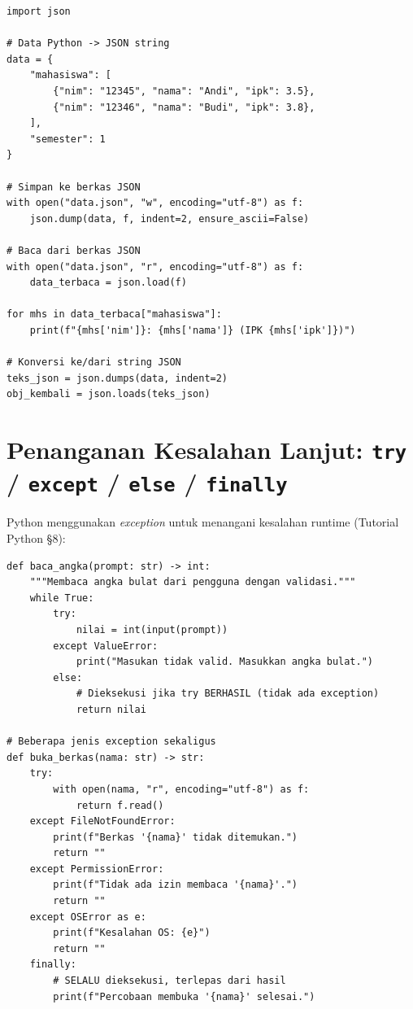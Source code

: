 \documentclass[../main.tex]{subfiles}
\begin{document}
\begin{lstlisting}[caption=Membaca dan menulis JSON]
import json

# Data Python -> JSON string
data = {
    "mahasiswa": [
        {"nim": "12345", "nama": "Andi", "ipk": 3.5},
        {"nim": "12346", "nama": "Budi", "ipk": 3.8},
    ],
    "semester": 1
}

# Simpan ke berkas JSON
with open("data.json", "w", encoding="utf-8") as f:
    json.dump(data, f, indent=2, ensure_ascii=False)

# Baca dari berkas JSON
with open("data.json", "r", encoding="utf-8") as f:
    data_terbaca = json.load(f)

for mhs in data_terbaca["mahasiswa"]:
    print(f"{mhs['nim']}: {mhs['nama']} (IPK {mhs['ipk']})")

# Konversi ke/dari string JSON
teks_json = json.dumps(data, indent=2)
obj_kembali = json.loads(teks_json)
\end{lstlisting}

\section{Penanganan Kesalahan Lanjut: \texttt{try} / \texttt{except} / \texttt{else} / \texttt{finally}}

Python menggunakan \textit{exception} untuk menangani kesalahan runtime (Tutorial Python §8):

\begin{lstlisting}[caption=Pola try/except/else/finally lengkap]
def baca_angka(prompt: str) -> int:
    """Membaca angka bulat dari pengguna dengan validasi."""
    while True:
        try:
            nilai = int(input(prompt))
        except ValueError:
            print("Masukan tidak valid. Masukkan angka bulat.")
        else:
            # Dieksekusi jika try BERHASIL (tidak ada exception)
            return nilai

# Beberapa jenis exception sekaligus
def buka_berkas(nama: str) -> str:
    try:
        with open(nama, "r", encoding="utf-8") as f:
            return f.read()
    except FileNotFoundError:
        print(f"Berkas '{nama}' tidak ditemukan.")
        return ""
    except PermissionError:
        print(f"Tidak ada izin membaca '{nama}'.")
        return ""
    except OSError as e:
        print(f"Kesalahan OS: {e}")
        return ""
    finally:
        # SELALU dieksekusi, terlepas dari hasil
        print(f"Percobaan membuka '{nama}' selesai.")
\end{lstlisting}
\end{document}
